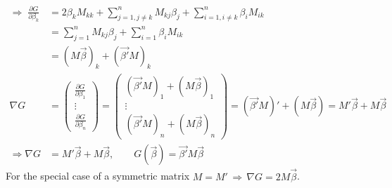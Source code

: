 \begin{align*}
	\Longrightarrow\;\frac{\partial G}{\partial \beta_k}&=2\beta_k  M_{kk}+\sum\limits_{j=1,j\neq k}^n M_{kj} \beta_j+\sum\limits_{i=1,i\neq k}^n \beta_i   M_{ik}\\
	&=\sum\limits_{j=1}^n M_{kj} \beta_j+\sum\limits_{i=1}^n \beta_i   M_{ik}\\	
	&=(M \vec{\beta})_k+(\vec{\beta'}  M)_k\\
	\nabla G&=\begin{pmatrix}
		\frac{\partial G}{\partial \beta_1}\\
		\vdots\\
		\frac{\partial G}{\partial \beta_n}
	\end{pmatrix}=\begin{pmatrix}
		(\vec{\beta'}  M)_1+(M \vec{\beta})_1\\
		\vdots\\
		(\vec{\beta'}  M)_n+(M \vec{\beta})_n	
	\end{pmatrix}=(\vec{\beta'}  M)'+(M \vec{\beta})=M' \vec{\beta}+M \vec{\beta}\\
	\Longrightarrow\nabla G&=M' \vec{\beta}+M \vec{\beta},\qquad G(\vec{\beta})=\vec{\beta'}  M \vec{\beta}
\end{align*}
For the special case of a symmetric matrix $M=M'\,\Longrightarrow\,\nabla G=2  M \vec{\beta}$.
